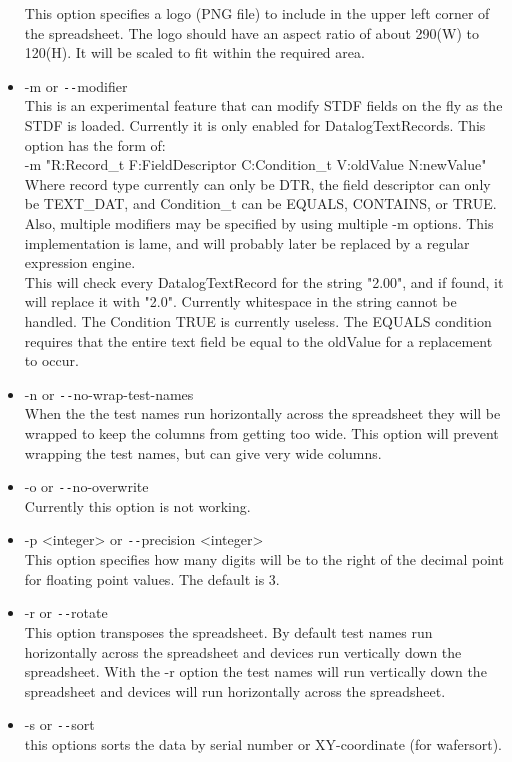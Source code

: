 \documentclass[letterpaper]{article}
\begin{document}
\begin{itemize}
This option specifies a logo (PNG file) to include in the upper left
corner of the spreadsheet.  The logo should have an aspect ratio of
about 290(W) to 120(H).  It will be scaled to fit within the required area.
\item -m or \texttt{-{}-}modifier\\
This is an experimental feature that can modify STDF fields on the fly as the STDF is loaded.
Currently it is only enabled for DatalogTextRecords. This option has the form of:\\
-m "R:Record\_t F:FieldDescriptor C:Condition\_t V:oldValue N:newValue"\\
Where record type currently can only be DTR, the field descriptor can only be TEXT\_DAT, and
Condition\_t can be EQUALS, CONTAINS, or TRUE.  Also, multiple modifiers may be specified by using multiple -m options.
This implementation is lame, and will probably later be replaced by a regular expression engine.\\
This will check every DatalogTextRecord for the string "2.00", and
if found, it will replace it with "2.0".  Currently whitespace in the
string cannot be handled.  The Condition TRUE is currently useless. The EQUALS
condition requires that the entire text field be equal to the oldValue for
a replacement to occur.
\item -n or \texttt{-{}-}no-wrap-test-names\\
When the the test names run horizontally across the spreadsheet they will be wrapped
to keep the columns from getting too wide.  This option will prevent wrapping the test
names, but can give very wide columns.
\item -o or \texttt{-{}-}no-overwrite\\
Currently this option is not working.
\item -p <integer> or \texttt{-{}-}precision <integer>\\
This option specifies how many digits will be to the right of the decimal
point for floating point values.  The default is 3.
\item -r or \texttt{-{}-}rotate\\
This option transposes the spreadsheet.  By default test names run horizontally across
the spreadsheet and devices run vertically down the spreadsheet. With the -r option
the test names will run vertically down the spreadsheet and devices will run horizontally
across the spreadsheet.
\item -s or \texttt{-{}-}sort\\
this options sorts the data by serial number or XY-coordinate (for wafersort).

\end{itemize}
\end{document}
